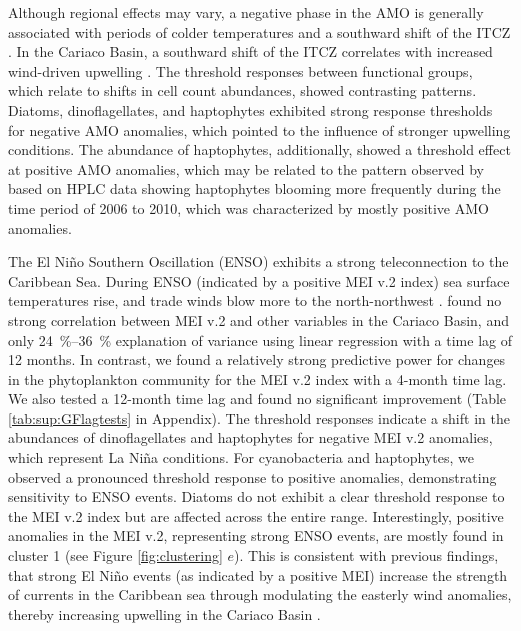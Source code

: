 \documentclass[draft]{agujournal2019}
\begin{document}
    Although regional effects may vary, a negative phase in the AMO is generally associated with periods of colder temperatures and a southward shift of the ITCZ \cite{knight_climate_2006, colna2017latitudinal}. In the Cariaco Basin, a southward shift of the ITCZ correlates with increased wind-driven upwelling \cite{taylor_ecosystem_2012}. The threshold responses between functional groups, which relate to shifts in cell count abundances, showed contrasting patterns. Diatoms, dinoflagellates, and haptophytes exhibited strong response thresholds for negative AMO anomalies, which pointed to the influence of stronger upwelling conditions. The abundance of haptophytes, additionally, showed a threshold effect at positive AMO anomalies, which may be related to the pattern observed by \citeauthor{pinckney_phytoplankton_2015} based on HPLC data showing haptophytes blooming more frequently during the time period of 2006 to 2010, which was characterized by mostly positive AMO anomalies.
    
    The El Niño Southern Oscillation (ENSO) exhibits a strong teleconnection to the Caribbean Sea. During ENSO (indicated by a positive MEI v.2 index) sea surface temperatures rise, and trade winds blow more to the north-northwest \cite{enfield_tropical_1997}.  found no strong correlation between MEI v.2 and other variables in the Cariaco Basin, and only \qtyrange{24}{36}{\%} explanation of variance using linear regression with a time lag of 12 months. In contrast, we found a relatively strong predictive power for changes in the phytoplankton community for the MEI v.2 index with a 4-month time lag. We also tested a 12-month time lag and found no significant improvement (Table \ref{tab:sup:GFlagtests} in Appendix).
    The threshold responses indicate a shift in the abundances of dinoflagellates and haptophytes for negative MEI v.2 anomalies, which represent La Niña conditions. For cyanobacteria and haptophytes, we observed a pronounced threshold response to positive anomalies, demonstrating sensitivity to ENSO events. Diatoms do not exhibit a clear threshold response to the MEI v.2 index but are affected across the entire range. Interestingly, positive anomalies in the MEI v.2, representing strong ENSO events, are mostly found in cluster 1 (see Figure \ref{fig:clustering} $e$). This is consistent with previous findings, that strong El Niño events (as indicated by a positive MEI) increase the strength of currents in the Caribbean sea through modulating the easterly wind anomalies, thereby increasing upwelling in the Cariaco Basin \cite{huang_enso_2023}.
    
\end{document}
